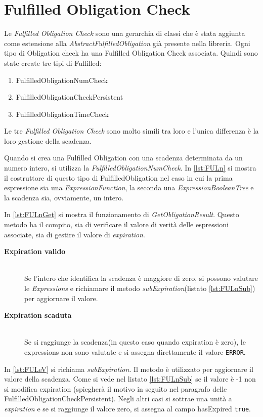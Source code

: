 \section{Fulfilled Obligation Check}
\label{sec:FulfilledObligationCheck}
Le \emph{Fulfilled Obligation Check} sono una gerarchia di classi che è stata aggiunta
come estensione alla \emph{AbstractFulfilledObligation} già presente nella libreria.
Ogni tipo di Obligation check ha una Fulfilled Obligation Check associata. Quindi sono state create
tre tipi di Fulfilled:
\begin{enumerate}
  \item FulfilledObligationNumCheck
  \item FulfilledObligationCheckPersistent
  \item FulfilledObligationTimeCheck
\end{enumerate}
Le tre \emph{Fulfilled Obligation Check} sono molto simili
tra loro e l'unica differenza è la loro gestione della scadenza.

Quando si crea una Fulfilled Obligation con una scadenza determinata da un numero intero, si utilizza
la \emph{FulfilledObligationNumCheck}. In \ref{lst:FULn} si mostra il costruttore di questo tipo di
FulfilledObligation nel caso in cui la prima espressione sia una \emph{ExpressionFunction}, la seconda
una \emph{ExpressionBooleanTree} e la scadenza sia, ovviamente, un intero.

In \ref{lst:FULnGet} si mostra il funzionamento di \emph{GetObligationResult}.
Questo metodo ha il compito, sia di verificare il valore di
verità delle espressioni associate, sia di gestire il valore di \emph{expiration}.
\begin{description}
  \item[\normalfont\bfseries{\MakeUppercase{E}xpiration valido}]
  {
  \hfill \\
  Se l'intero che identifica la scadenza è maggiore di zero,
  si possono valutare le \emph{Expressions} e richiamare il metodo \emph{subExpiration}(listato \ref{lst:FULnSub})
  per aggiornare il valore.
  }
  \item[\normalfont\bfseries{\MakeUppercase{E}xpiration scaduta}]
  {
  \hfill \\
  Se si raggiunge la scadenza(in questo caso quando expiration è zero), le expressions non sono valutate
  e si assegna direttamente il valore \texttt{ERROR}.
  }
\end{description}
In \ref{lst:FULeV} si richiama \emph{subExpiration}. Il metodo è utilizzato per aggiornare il
valore della scadenza. Come si vede nel listato \ref{lst:FULnSub} se il valore è -1 non si modifica expiration
(spiegherà il motivo in seguito nel paragrafo delle FulfilledObligationCheckPersistent).
Negli altri casi si sottrae una unità a \emph{expiration} e
se si raggiunge il valore zero, si assegna al campo hasExpired \texttt{true}.

